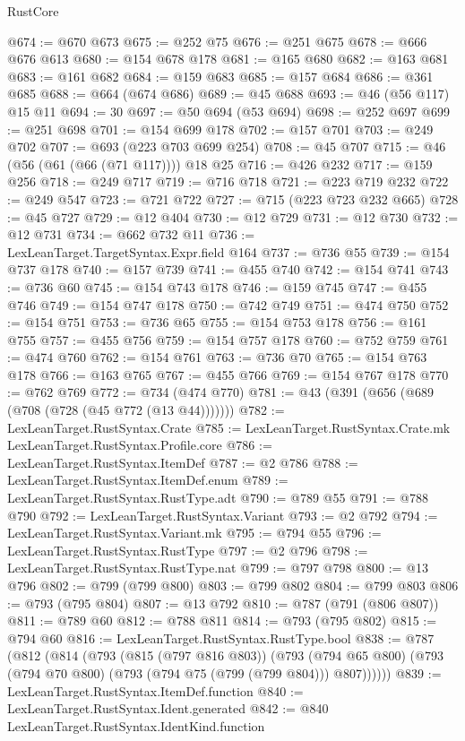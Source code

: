 \begin{lexlean}{RustCore}
\begin{coremodule}
@674 := @670 @673
@675 := @252 @75
@676 := @251 @675
@678 := @666 @676 @613
@680 := @154 @678 @178
@681 := @165 @680
@682 := @163 @681
@683 := @161 @682
@684 := @159 @683
@685 := @157 @684
@686 := @361 @685
@688 := @664 (@674 @686)
@689 := @45 @688
@693 := @46 (@56 @117) @15 @11
@694 := 30
@697 := @50 @694 (@53 @694)
@698 := @252 @697
@699 := @251 @698
@701 := @154 @699 @178
@702 := @157 @701
@703 := @249 @702
@707 := @693 (@223 @703 @699 @254)
@708 := @45 @707
@715 := @46 (@56 (@61 (@66 (@71 @117)))) @18 @25
@716 := @426 @232
@717 := @159 @256
@718 := @249 @717
@719 := @716 @718
@721 := @223 @719 @232
@722 := @249 @547
@723 := @721 @722
@727 := @715 (@223 @723 @232 @665)
@728 := @45 @727
@729 := @12 @404
@730 := @12 @729
@731 := @12 @730
@732 := @12 @731
@734 := @662 @732 @11
@736 := LexLeanTarget.TargetSyntax.Expr.field @164
@737 := @736 @55
@739 := @154 @737 @178
@740 := @157 @739
@741 := @455 @740
@742 := @154 @741
@743 := @736 @60
@745 := @154 @743 @178
@746 := @159 @745
@747 := @455 @746
@749 := @154 @747 @178
@750 := @742 @749
@751 := @474 @750
@752 := @154 @751
@753 := @736 @65
@755 := @154 @753 @178
@756 := @161 @755
@757 := @455 @756
@759 := @154 @757 @178
@760 := @752 @759
@761 := @474 @760
@762 := @154 @761
@763 := @736 @70
@765 := @154 @763 @178
@766 := @163 @765
@767 := @455 @766
@769 := @154 @767 @178
@770 := @762 @769
@772 := @734 (@474 @770)
@781 := @43 (@391 (@656 (@689 (@708 (@728 (@45 @772 (@13 @44)))))))
@782 := LexLeanTarget.RustSyntax.Crate
@785 := LexLeanTarget.RustSyntax.Crate.mk LexLeanTarget.RustSyntax.Profile.core
@786 := LexLeanTarget.RustSyntax.ItemDef
@787 := @2 @786
@788 := LexLeanTarget.RustSyntax.ItemDef.enum
@789 := LexLeanTarget.RustSyntax.RustType.adt
@790 := @789 @55
@791 := @788 @790
@792 := LexLeanTarget.RustSyntax.Variant
@793 := @2 @792
@794 := LexLeanTarget.RustSyntax.Variant.mk
@795 := @794 @55
@796 := LexLeanTarget.RustSyntax.RustType
@797 := @2 @796
@798 := LexLeanTarget.RustSyntax.RustType.nat
@799 := @797 @798
@800 := @13 @796
@802 := @799 (@799 @800)
@803 := @799 @802
@804 := @799 @803
@806 := @793 (@795 @804)
@807 := @13 @792
@810 := @787 (@791 (@806 @807))
@811 := @789 @60
@812 := @788 @811
@814 := @793 (@795 @802)
@815 := @794 @60
@816 := LexLeanTarget.RustSyntax.RustType.bool
@838 := @787
    (@812
      (@814
        (@793
          (@815 (@797 @816 @803))
          (@793 (@794 @65 @800) (@793 (@794 @70 @800) (@793 (@794 @75 (@799 (@799 @804))) @807))))))
@839 := LexLeanTarget.RustSyntax.ItemDef.function
@840 := LexLeanTarget.RustSyntax.Ident.generated
@842 := @840 LexLeanTarget.RustSyntax.IdentKind.function

\end{coremodule}
\end{lexlean}

